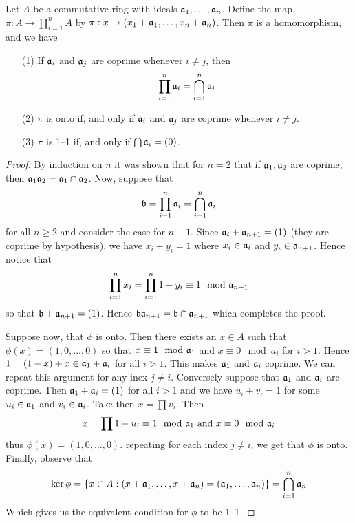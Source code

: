 \begin{theorem}\label{theorem_5.5.11}
  Let $A$ be a commutative ring with ideals $\mathfrak{a}_1, \dots, \mathfrak{a}_n$. Define the
  map $\pi:A \xrightarrow{} \prod_{i=1}^n{A}$ by $\pi:x \xrightarrow{}
  (x_1+\mathfrak{a}_1, \dots, x_n+\mathfrak{a}_n)$. Then $\pi$ is a homomorphism, and we have
  \begin{enumerate}
    \item[(1)] If $\mathfrak{a}_i$ and  $\mathfrak{a}_j$ are coprime whenever $i \neq j$, then
      \begin{equation*}
        \prod_{i=1}^n{\mathfrak{a}_i}=\bigcap_{i=1}^n{\mathfrak{a}_i}
      \end{equation*}

    \item[(2)] $\pi$ is onto if, and only if $\mathfrak{a}_i$ and $\mathfrak{a}_j$ are coprime
      whenever  $i \neq j$.

    \item[(3)] $\pi$ is 1--1 if, and only if  $\bigcap{\mathfrak{a}_i}=(0)$.
  \end{enumerate}
\end{theorem}
\begin{proof}
  By induction on $n$ it was shown that for $n=2$ that if $\mathfrak{a}_1,\mathfrak{a}_2$ are
  coprime, then $\mathfrak{a}_1\mathfrak{a}_2=\mathfrak{a}_1 \cap \mathfrak{a}_2$. Now, suppose that
  \begin{equation*}
    \mathfrak{b}=\prod_{i=1}^n{\mathfrak{a}_i}=\bigcap_{i=1}^n{\mathfrak{a}_i}
  \end{equation*}
  for all $n \geq 2$ and consider the case for $n+1$. Since
  $\mathfrak{a}_i+\mathfrak{a}_{n+1}=(1)$ (they are coprime by hypothesis), we have $x_i+y_i=1$
  where  $x_i \in \mathfrak{a}_i$ and  $y_i \in \mathfrak{a}_{n+1}$. Hence notice that
  \begin{equation*}
    \prod_{i=1}^n{x_i}=\prod_{i=1}^n{1-y_i} \equiv 1 \mod{\mathfrak{a}_{n+1}}
  \end{equation*}
  so that $\mathfrak{b}+\mathfrak{a}_{n+1}=(1)$. Hence $\mathfrak{b}\mathfrak{a}_{n+1}=\mathfrak{b} \cap \mathfrak{a}_{n+1}$ which
  completes the proof.

  Suppose now, that $\phi$ is onto. Then there exists an  $x \in A$ such that
  $\phi(x)=(1,0, \dots, 0)$ so that $x \equiv 1 \mod{\mathfrak{a}_1}$ and $x \equiv 0
  \mod{a_i}$ for $i>1$. Hence  $1=(1-x)+x \in \mathfrak{a}_1+\mathfrak{a}_i$ for all $i>1$.
  This makes  $\mathfrak{a}_1$ and $\mathfrak{a}_i$ coprime. We can repeat this argument for
  any inex  $j \neq i$. Conversely suppose that $\mathfrak{a}_1$ and $\mathfrak{a}_i$ are
  coprime. Then $\mathfrak{a}_1+\mathfrak{a}_i=(1)$ for all $i>1$ and we have  $u_i+v_i=1$ for
  some  $u_i \in \mathfrak{a}_1$ and $v_i \in \mathfrak{a}_i$. Take then  $x=\prod{v_i}$. Then
  \begin{equation*}
    x=\prod{1-u_i} \equiv 1 \mod{\mathfrak{a}_1} \text{ and } x \equiv 0 \mod{\mathfrak{a}_i}
  \end{equation*}
  thus $\phi(x)=(1,0, \dots, 0)$. repeating for each index $j \neq i$, we get
  that  $\phi$ is onto. Finally, observe that
  \begin{equation*}
    \ker{\phi}=\{x \in A : (x+\mathfrak{a}_1, \dots,x+\mathfrak{a}_n)=(\mathfrak{a}_1, \dots, \mathfrak{a}_n)\}=
    \bigcap_{i=1}^n{\mathfrak{a}_n}
  \end{equation*}
  Which gives us the equivalent condition for $\phi$ to be 1--1.
\end{proof}


